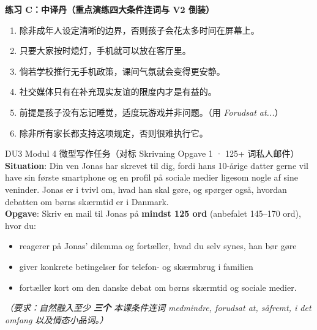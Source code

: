 \textbf{练习 C：中译丹（重点演练四大条件连词与 V2 倒装）}
\begin{enumerate}
  \item 除非成年人设定清晰的边界，否则孩子会花太多时间在屏幕上。
  \item 只要大家按时熄灯，手机就可以放在客厅里。
  \item 倘若学校推行无手机政策，课间气氛就会变得更安静。
  \item 社交媒体只有在补充现实友谊的限度内才是有益的。
  \item 前提是孩子没有忘记睡觉，适度玩游戏并非问题。（用 \textit{Forudsat at...}）
  \item 除非所有家长都支持这项规定，否则很难执行它。
\end{enumerate}


\begin{emailbox}{DU3 Modul 4 微型写作任务（对标 Skrivning Opgave 1 · 125+ 词私人邮件）}
\textbf{Situation}: Din ven Jonas har skrevet til dig, fordi hans 10-årige datter gerne vil have sin første smartphone og en profil på sociale medier ligesom nogle af sine veninder. Jonas er i tvivl om, hvad han skal gøre, og spørger også, hvordan debatten om børns skærmtid er i Danmark.\\[4pt]
\textbf{Opgave}: Skriv en mail til Jonas på \textbf{mindst 125 ord} (anbefalet 145--170 ord), hvor du:
\begin{itemize}
  \item reagerer på Jonas' dilemma og fortæller, hvad du selv synes, han bør gøre
  \item giver konkrete betingelser for telefon- og skærmbrug i familien
  \item fortæller kort om den danske debat om børns skærmtid og sociale medier.
\end{itemize}
\textit{（要求：自然融入至少 \textbf{三个} 本课条件连词 \textit{medmindre, forudsat at, såfremt, i det omfang} 以及情态小品词。）}
\end{emailbox}

